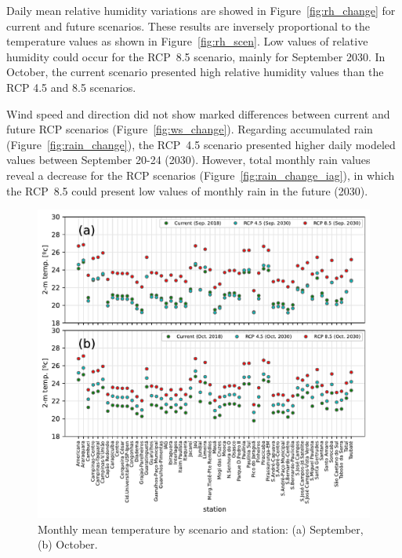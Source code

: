 Daily mean relative humidity variations are showed in Figure~\ref{fig:rh_change} for current and future scenarios.
These results are inversely proportional to the temperature values as shown in Figure~\ref{fig:rh_scen}.
Low values of relative humidity could occur for the RCP~8.5 scenario, mainly for September 2030.
In October, the current scenario presented high relative humidity values than the RCP 4.5 and 8.5 scenarios.

Wind speed and direction did not show marked differences between current and future RCP scenarios (Figure~\ref{fig:ws_change}).
Regarding accumulated rain (Figure~\ref{fig:rain_change}), the RCP~4.5 scenario presented higher daily modeled values between September 20-24 (2030).
However, total monthly rain values reveal a decrease for the RCP scenarios (Figure~\ref{fig:rain_change_iag}), in which the RCP~8.5 could present low values of monthly rain in the future (2030).

 \begin{figure}[!ht]
  \includegraphics[width=1\textwidth]{fig/temp_sep_oct.pdf}
  \caption{Monthly mean temperature by scenario and station: (a) September, (b) October.}
  \label{fig:temp_scen}
\end{figure}

